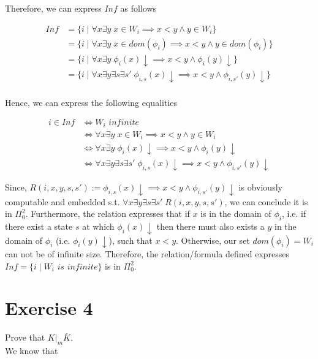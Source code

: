 \documentclass[11pt,a4paper]{article}
\begin{document}
Therefore, we can express $Inf$ as follows

\begin{equation*}
\begin{split}
Inf & = \{i \mid  \forall x \exists y \; x \in W_i  \implies x<y  \wedge y \in W_i \} \\
& = \{i \mid  \forall x \exists y \;  x \in dom(\phi_i) \implies x<y \wedge y \in dom(\phi_i) \} \\
& = \{i \mid  \forall x \exists y \; \phi_i(x)\downarrow \implies  x<y \wedge \phi_i(y)\downarrow  \} \\
& = \{i \mid  \forall x \exists y \exists s \exists s'  \; \phi_{i,s}(x)\downarrow \implies  x<y \wedge  \phi_{i,s'}(y)\downarrow  \} \\
\end{split}
\end{equation*}


Hence, we can express the following equalities

\begin{equation*}
\begin{split}
i \in Inf &  \iff W_i \textit{ infinite}  \\
& \iff \forall x \exists y \; x \in W_i \implies x<y \wedge y \in W_i\\
& \iff \forall x \exists y \; \phi_i(x)\downarrow \implies  x<y \wedge \phi_i(y)\downarrow \\
& \iff \forall x \exists y \exists s \exists s'  \; \phi_{i,s}(x)\downarrow \implies x<y \wedge  \phi_{i,s'}(y)\downarrow
\end{split}
\end{equation*}

Since, $ R(i,x,y,s,s') :=  \phi_{i,s}(x)\downarrow \implies x<y \wedge \phi_{i,s'}(y)\downarrow$ is obviously computable and 
embedded s.t. $ \forall x \exists y \exists s \exists s' \; R(i,x,y,s,s')$, we can conclude it is in $\Pi_0^2$. Furthermore, the
relation expresses that if $x$ is in the domain of $\phi_i$, i.e. if there exist a state $s$ at which  $\phi_i(x)\downarrow$ 
then there must also exists a $y$ in the domain of $\phi_i$ (i.e. $\phi_i(y)\downarrow$), such that $x<y$. 
Otherwise, our set $dom(\phi_i)=W_i$ can not be of infinite size. Therefore, the relation/formula defined expresses $Inf = \{i \mid W_i \textit{ is infinite}\}$ is in  $\Pi_0^2$.


\section*{Exercise 4}
Prove that $K|_m \overline{K}$.
\\
We know that 
\end{document}
